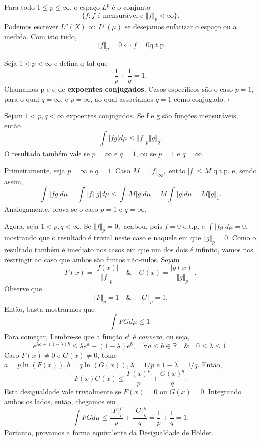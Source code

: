 \documentclass[MeasureTheory/measure_theory.tex]{subfiles}
\begin{document}
Para todo \(1\leq p\leq \infty\), o espaço \(L^{p}\) é o conjunto
\[
	\{f: f \text{ é mensurável e }\Vert f \Vert_{p}<\infty\}.
\]
Podemos escrever \(L^{p}(X)\) ou \(L^{p}(\mu )\) se desejamos enfatizar o espaço ou a medida. Com isto tudo,
\[
	\Vert f \Vert_{p} = 0 \Longleftrightarrow f = 0 \mathrm{q.t.p}
\]
\begin{def*}
	Seja \(1 < p < \infty\) e defina q tal que
	\[
		\frac{1}{p} + \frac{1}{q} = 1.
	\]
	Chamamos p e q de \textbf{expoentes conjugados}. Casos específicos são o caso \(p =1 \), para o qual \(q=\infty\), e \(p = \infty\), ao qual associamos \(q = 1\) como conjugado. \(\square\)
\end{def*}
\hypertarget{holder}{
	\begin{prop*}
		Sejam \(1 < p, q < \infty\) expoentes conjugados. Se f e g são funções mensuráveis, então
		\[
			\int_{}^{}|fg|d\mu \leq \Vert f \Vert_{p}\Vert g \Vert_{q}.
		\]
		O resultado também vale se \(p=\infty\) e \(q=1\), ou se \(p = 1\) e \(q=\infty\).
	\end{prop*}
}
\begin{proof*}
	Primeiramente, seja \(p=\infty\) e \(q=1\). Caso \(M = \Vert f \Vert_{\infty},\) então \(|f|\leq M\) q.t.p. e, sendo assim,
	\[
		\int_{}^{}|fg|d\mu = \int_{}^{}|f||g|d\mu \leq \int_{}^{}M|g|d\mu = M \int_{}^{}|g|d\mu = M \Vert g \Vert_{1}.
	\]
	Analogamente, prova-se o caso \(p=1\) e \(q=\infty\).

	Agora, seja \(1 < p, q < \infty\). Se \(\Vert f \Vert_{p} = 0,\) acabou, pois \(f=0\) q.t.p. e \(\int_{}^{}|fg|d\mu  = 0,\) mostrando que o resultado é trivial neste caso e naquele em que \(\Vert g \Vert_{p} = 0.\) Como
	o resultado também é imediato nos casos em que um dos dois é infinito, vamos nos restringir ao caso que ambos são finitos não-nulos. Sejam
	\[
		F(x) = \frac{|f(x)|}{\Vert f \Vert_{p}}\quad\&\quad G(x) = \frac{|g(x)|}{\Vert g \Vert_{p}}.
	\]
	Observe que
	\[
		\Vert F \Vert_{p} = 1\quad\&\quad \Vert G \Vert_{p} = 1.
	\]
	Então, basta mostrarmos que
	\[
		\int_{}^{}FGd\mu \leq 1.
	\]
	Para começar, Lembre-se que a função \(e^{t}\) é \textit{convexa}, ou seja,
	\[
		e^{\lambda a + (1-\lambda )b}\leq \lambda e^{a}+(1-\lambda )e^{b},\quad \forall a\leq b\in \mathbb{R}\quad\&\quad 0\leq \lambda \leq 1.
	\]
	Caso \(F(x)\neq0\) e \(G(x)\neq0\), tome \(a = p \ln^{}{(F(x))}, b = q\ln^{}{(G(x))}, \lambda = 1/p\) e \(1-\lambda =1/q.\) Então,
	\[
		F(x)G(x)\leq \frac{F(x)^{p}}{p} + \frac{G(x)^{q}}{q}.
	\]
	Esta desigualdade vale trivialmente se \(F(x) = 0\) ou \(G(x) = 0.\) Integrando ambos os lados, então, chegamos em
	\[
		\int_{}FG d\mu_{}\leq \frac{\Vert F \Vert_{p}^{p}}{p}+\frac{\Vert G \Vert_{q}^{q}}{q} = \frac{1}{p} + \frac{1}{q} = 1.
	\]
	Portanto, provamos a forma equivalente da Desigualdade de Hölder. \qedsymbol
\end{proof*}
\end{document}
